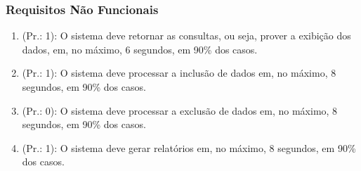 \subsubsection{Requisitos Não Funcionais}
\begin{enumerate}[
	label=RNF\arabic{*}, 
	ref=(RNF\arabic{*}),
	leftmargin=1.5em,
	itemindent=4.5em]
\item (Pr.: 1): O sistema deve retornar as consultas, ou seja, prover a exibição dos dados, em, no máximo, 6 segundos, em 90\% dos casos.
\item (Pr.: 1): O sistema deve processar a inclusão de dados em, no máximo, 8 segundos, em 90\% dos casos.
\item (Pr.: 0): O sistema deve processar a exclusão de dados em, no máximo, 8 segundos, em 90\% dos casos.
\item (Pr.: 1): O sistema deve gerar relatórios em, no máximo, 8 segundos, em 90\% dos casos.
\end{enumerate}
